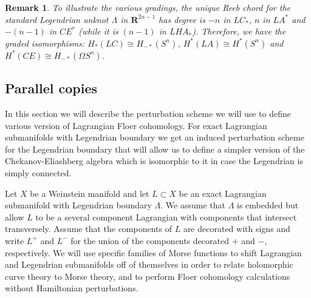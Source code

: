 \documentclass{gtpart}
\newtheorem{rem}[thm]{Remark}
\renewcommand{\k}{\mathbf{k}}
\newcommand{\m}{\mathfrak{m}}
\renewcommand{\R}{\mathbf{R}}
\begin{document}
%
%
%
%
%

\begin{rem} \label{spherecon}  
To illustrate the various gradings, the unique Reeb chord for the standard Legendrian unknot $\Lambda$ in $\R^{2n-1}$ has degree is $-n$ in $LC_*$, $n$ in
    $LA^*$ and $-(n-1)$ in $CE^*$ (while it is $(n-1)$ in $LHA_*$).
    Therefore, we have the graded isomorphisms: $H_*(LC) \cong H_{-*}(S^{n})$, $H^*(LA)
    \cong H^*(S^{n})$ and $H^*(CE) \cong H_{-*} (\Omega S^{n})$.
\end{rem}

\subsection{Parallel copies}\label{sec:parallel}
In this section we will describe the perturbation scheme we will use to define various version of Lagrangian Floer cohomology. For exact Lagrangian submanifolds with Legendrian boundary we get an induced perturbation scheme for the Legendrian boundary that will allow us to define a simpler version of the Chekanov-Eliashberg algebra which is isomorphic to it in case the Legendrian is simply connected. 

Let $X$ be a Weinstein manifold and let $L\subset X$ be an exact Lagrangian submanifold with
Legendrian boundary $\Lambda$. We assume that $\Lambda$ is embedded but allow $L$ to be a several
component Lagrangian with components that intersect transversely. Assume that the components of $L$
are decorated with signs and write $L^{+}$ and $L^{-}$ for the union of the components decorated
$+$ and $-$, respectively. We will use specific families of Morse functions to shift Lagrangian
and Legendrian submanifolds off of themselves in order to relate holomorphic curve theory to Morse
theory, and to perform Floer cohomology calculations without Hamiltonian perturbations. 
\end{document}

